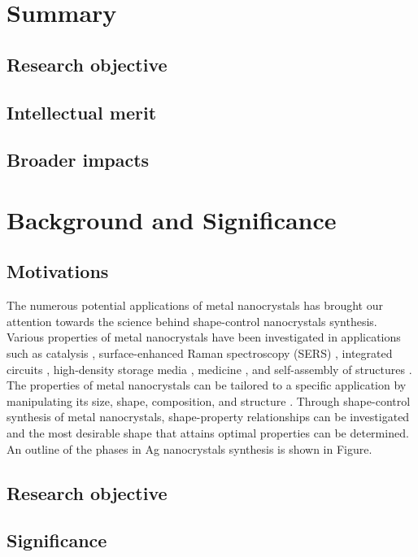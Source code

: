\section{Summary}

\subsection{Research objective}

\subsection{Intellectual merit}

\subsection{Broader impacts}

\section{Background and Significance}

\subsection{Motivations}
The numerous potential applications of metal nanocrystals has brought our attention towards the science behind shape-control nanocrystals synthesis. Various properties of metal nanocrystals have been investigated in applications such as catalysis \cite{Burda_2005}, surface-enhanced Raman spectroscopy (SERS) \cite{McLellan_2006}, integrated circuits \cite{Wiley_2006}, high-density storage media \cite{Aslam_2005}, medicine \cite{Au_2008}, and self-assembly of structures \cite{Glotzer_2007}. The properties of metal nanocrystals can be tailored to a specific application by manipulating its size, shape, composition, and structure \cite{Xia_2008}. Through shape-control synthesis of metal nanocrystals, shape-property relationships can be investigated and the most desirable shape that attains optimal properties can be determined. An outline of the phases in Ag nanocrystals synthesis is shown in Figure.



\subsection{Research objective}

\subsection{Significance}

